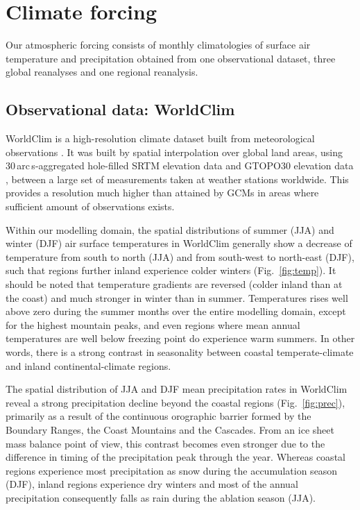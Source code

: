 \section{Climate forcing}
\label{sec:climate}

Our atmospheric forcing consists of monthly climatologies of surface air temperature and precipitation obtained from one observational dataset, three global reanalyses and one regional reanalysis.

\subsection{Observational data: WorldClim}

WorldClim is a high-resolution climate dataset built from meteorological observations \citep{data:worldclim}. It was built by spatial interpolation over global land areas, using 30\,arc\,s-aggregated hole-filled SRTM elevation data \citep{data:srtm} and GTOPO30 elevation data \citep{data:gtopo30}, between a large set of measurements taken at weather stations worldwide. This provides a resolution much higher than attained by GCMs in areas where sufficient amount of observations exists.

Within our modelling domain, the spatial distributions of summer (JJA) and winter (DJF) air surface temperatures in WorldClim generally show a decrease of temperature from south to north (JJA) and from south-west to north-east (DJF), such that regions further inland experience colder winters (Fig.~\ref{fig:temp}). It should be noted that temperature gradients are reversed (colder inland than at the coast) and much stronger in winter than in summer. Temperatures rises well above zero during the summer months over the entire modelling domain, except for the highest mountain peaks, and even regions where mean annual temperatures are well below freezing point do experience warm summers. In other words, there is a strong contrast in seasonality between coastal temperate-climate and inland continental-climate regions.

The spatial distribution of JJA and DJF mean precipitation rates in WorldClim reveal a strong precipitation decline beyond the coastal regions (Fig.~\ref{fig:prec}), primarily as a result of the continuous orographic barrier formed by the Boundary Ranges, the Coast Mountains and the Cascades. From an ice sheet mass balance point of view, this contrast becomes even stronger due to the difference in timing of the precipitation peak through the year. Whereas coastal regions experience most precipitation as snow during the accumulation season (DJF), inland regions experience dry winters and most of the annual precipitation consequently falls as rain during the ablation season (JJA).

